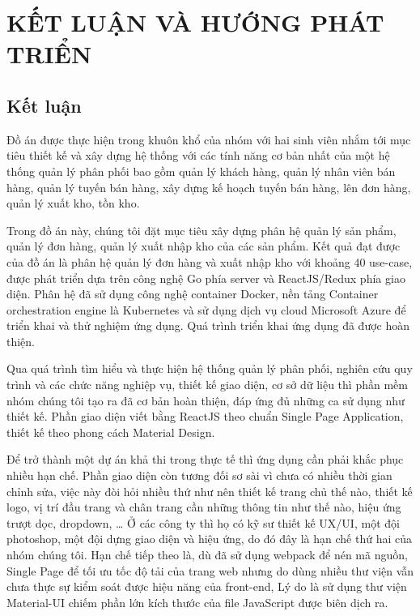 \chapter{KẾT LUẬN VÀ HƯỚNG PHÁT TRIỂN}
\section{Kết luận}
Đồ án được thực hiện trong khuôn khổ của nhóm với hai sinh viên
nhắm tới mục tiêu thiết kế và xây dựng hệ thống với các tính năng
cơ bản nhất của một hệ thống quản lý phân phối bao gồm quản lý
khách hàng, quản lý nhân viên bán hàng, quản lý tuyến bán hàng,
xây dựng kế hoạch tuyến bán hàng, lên đơn hàng, quản lý xuất kho,
tồn kho.

Trong đồ án này, chúng tôi đặt mục tiêu xây dựng phân hệ
quản lý sản phẩm, quản lý đơn hàng, quản lý xuất nhập kho
của các sản phẩm. Kết quả đạt được của đồ án là phân hệ
quản lý đơn hàng và xuất nhập kho với
khoảng 40 use-case, được phát triển
dựa trên công nghệ Go phía server và ReactJS/Redux phía giao
diện. Phân hệ đã sử dụng công nghệ container Docker,
nền tảng Container orchestration engine là Kubernetes và
sử dụng dịch vụ cloud Microsoft Azure để triển khai
và thử nghiệm ứng dụng. Quá trình triển khai ứng dụng đã
được hoàn thiện.

Qua quá trình tìm hiểu và thực hiện hệ thống quản lý phân phối,
nghiên cứu quy trình và các chức năng nghiệp vụ, thiết kế giao
diện, cơ sở dữ liệu thì phần mềm nhóm chúng tôi tạo ra đã cơ bản hoàn
thiện, đáp ứng đủ những ca sử dụng như thiết kế. Phần giao diện
viết bằng ReactJS theo chuẩn Single Page Application, thiết kế theo
phong cách Material Design. 

Để trở thành một dự án khả thi trong thực tế thì ứng dụng cần phải
khắc phục nhiều hạn chế. Phần giao diện còn tương đối sơ
sài vì chưa có nhiều thời gian chỉnh sửa,
việc này đòi hỏi nhiều thứ như nên thiết kế trang chủ thế nào,
thiết kế logo, vị trí đầu trang và chân trang cần những thông tin
như thế nào, hiệu ứng trượt dọc, dropdown, … Ở các công ty thì họ có
kỹ sư thiết kế UX/UI, một đội photoshop, một đội dựng giao diện
và hiệu ứng, do đó đây là hạn chế thứ hai của nhóm chúng tôi. Hạn chế
tiếp theo là, dù đã sử dụng webpack để nén mã nguồn, Single Page
để tối ưu tốc độ tải của trang web nhưng do dùng nhiều thư viện
vẫn chưa thực sự kiểm soát được hiệu năng của front-end, Lý do là
sử dụng thư viện Material-UI chiếm phần lớn kích thước của file
JavaScript được biên dịch ra.

